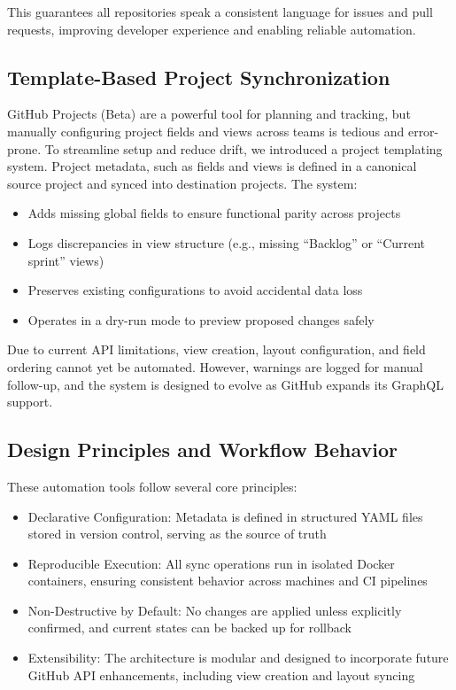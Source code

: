 \documentclass{article}
\begin{document}
This guarantees all repositories speak a consistent language for issues and pull
requests, improving developer experience and enabling reliable automation.

\subsection{Template-Based Project Synchronization}

GitHub Projects (Beta) are a powerful tool for planning and tracking, but manually
configuring project fields and views across teams is tedious and error-prone. To
streamline setup and reduce drift, we introduced a project templating system.
Project metadata, such as fields and views is defined in a canonical source project
and synced into destination projects. The system:

\begin{itemize}

  \item Adds missing global fields to ensure functional parity across projects

  \item Logs discrepancies in view structure (e.g., missing ``Backlog'' or ``Current
    sprint'' views)

  \item Preserves existing configurations to avoid accidental data loss

  \item Operates in a dry-run mode to preview proposed changes safely
\end{itemize}

Due to current API limitations, view creation, layout configuration, and field
ordering cannot yet be automated. However, warnings are logged for manual follow-up,
and the system is designed to evolve as GitHub expands its GraphQL support.

\subsection{Design Principles and Workflow Behavior}

These automation tools follow several core principles:

\begin{itemize}

  \item Declarative Configuration: Metadata is defined in structured YAML files
    stored in version control, serving as the source of truth

  \item Reproducible Execution: All sync operations run in isolated Docker
    containers, ensuring consistent behavior across machines and CI pipelines

  \item Non-Destructive by Default: No changes are applied unless explicitly
    confirmed, and current states can be backed up for rollback

  \item Extensibility: The architecture is modular and designed to incorporate
    future GitHub API enhancements, including view creation and layout syncing
\end{itemize}
\end{document}
